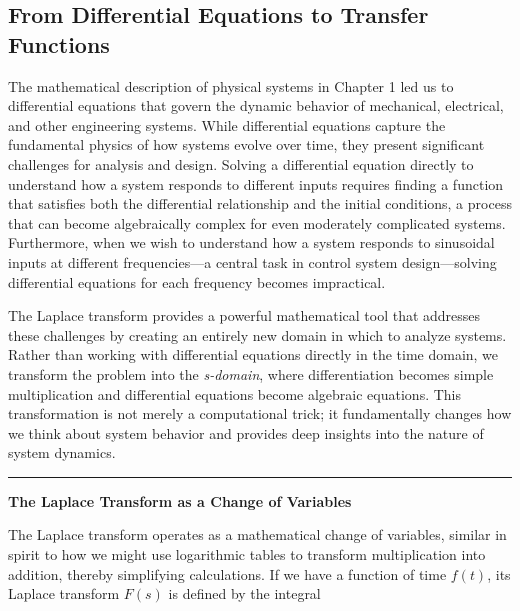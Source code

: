 \subsection{From Differential Equations to Transfer Functions}

The mathematical description of physical systems in Chapter 1 led us to differential equations that govern the dynamic behavior of mechanical, electrical, and other engineering systems. While differential equations capture the fundamental physics of how systems evolve over time, they present significant challenges for analysis and design. Solving a differential equation directly to understand how a system responds to different inputs requires finding a function that satisfies both the differential relationship and the initial conditions, a process that can become algebraically complex for even moderately complicated systems. Furthermore, when we wish to understand how a system responds to sinusoidal inputs at different frequencies---a central task in control system design---solving differential equations for each frequency becomes impractical.

The Laplace transform provides a powerful mathematical tool that addresses these challenges by creating an entirely new domain in which to analyze systems. Rather than working with differential equations directly in the time domain, we transform the problem into the \textit{s-domain}, where differentiation becomes simple multiplication and differential equations become algebraic equations. This transformation is not merely a computational trick; it fundamentally changes how we think about system behavior and provides deep insights into the nature of system dynamics.


\vspace{1em}
\hrule
\vspace{0.5em}
\color{UofSCGarnet}\textbf{The Laplace Transform as a Change of Variables}\color{UofSCBlack}
\vspace{0.5em}

The Laplace transform operates as a mathematical change of variables, similar in spirit to how we might use logarithmic tables to transform multiplication into addition, thereby simplifying calculations. If we have a function of time $f(t)$, its Laplace transform $F(s)$ is defined by the integral

